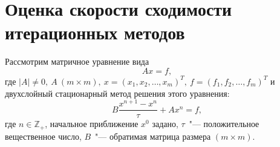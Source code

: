 \documentclass[11pt,a4paper,twoside]{report}
\numberwithin{equation}{section}
\theoremstyle{definition}
\theoremstyle{plain}
\begin{document}
\section{Оценка скорости сходимости итерационных методов}
%
Рассмотрим матричное уравнение вида
%
\begin{equation}
    \label{eq:linear-system4}
    Ax = f,
\end{equation}
%
где
$
|A| \ne 0, ~A~(m \times m),~
x = (x_1, x_2, \ldots, x_m)^T,~
f = (f_1, f_2, \ldots, f_m)^T
$ и двухслойный стационарный метод решения этого уравнения:
%
\begin{equation}
    \label{eq:iter-process3}
    B\frac{x^{n+1} - x^n}{\tau} + Ax^n = f,
\end{equation}
%
где $n \in \mathbb{Z}_+$, начальное приближение $x^0$ задано,
$\tau$~"--- положительное вещественное число, $B$~"--- обратимая матрица
размера $(m \times m)$.
\end{document}
